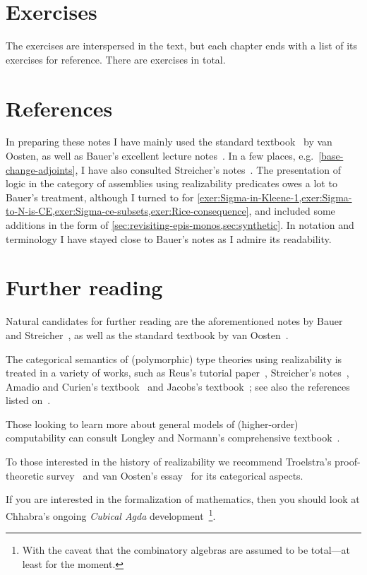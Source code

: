 \section{Exercises}

The exercises are interspersed in the text, but each chapter ends with a list of
its exercises for reference.
%
There are  exercises in total.

\section{References}

In preparing these notes I have mainly used the standard
textbook~\cite{vanOosten2008} by van Oosten, as well as Bauer's excellent
lecture notes~\cite{Bauer2023}.
%
In a few places, e.g.\ \cref{base-change-adjoints}, I have also consulted
Streicher's notes~\cite{Streicher2018}.
%
The presentation of logic in the category of assemblies using realizability
predicates owes a lot to Bauer's treatment, although I turned to
\cite[Section~3.2.7]{vanOosten2008} for
\cref{exer:Sigma-in-Kleene-1,exer:Sigma-to-N-is-CE,exer:Sigma-ce-subsets,exer:Rice-consequence},
and included some additions in the form of
\cref{sec:revisiting-epis-monos,sec:synthetic}.
%
In notation and terminology I have stayed close to Bauer's notes as I admire its
readability.

\section{Further reading}\label{sec:further-reading}

Natural candidates for further reading are the aforementioned
notes by Bauer~\cite{Bauer2023} and Streicher~\cite{Streicher2018}, as well as
the standard textbook by van Oosten~\cite{vanOosten2008}.

The categorical semantics of (polymorphic) type theories using realizability is
treated in a variety of works, such as Reus's tutorial paper~\cite{Reus1999},
Streicher's notes~\cite{Streicher2018}, Amadio and Curien's
textbook~\cite{AmadioCurien1998} and Jacobs's textbook~\cite{Jacobs1999}; see
also the references listed on~\cite[p.~193]{vanOosten2008}.

Those looking to learn more about general models of (higher-order) computability
can consult Longley and Normann's comprehensive
textbook~\cite{LongleyNormann2015}.

To those interested in the history of realizability we recommend Troelstra's
proof-theoretic survey~\cite{Troelstra1998} and van Oosten's
essay~\cite{vanOosten2002} for its categorical aspects.

If you are interested in the formalization of mathematics, then you should look
at Chhabra's ongoing \emph{Cubical Agda} development~\cite{Chhabra2023}\footnote{With
  the caveat that the combinatory algebras are assumed to be total---at least for
  the moment.}.


